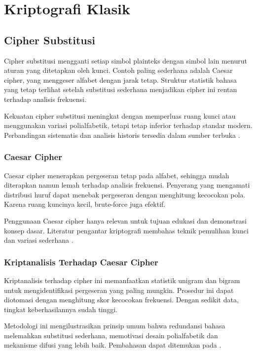 \documentclass[../main.tex]{subfiles}
\begin{document}
\chapter{Kriptografi Klasik}

\section{Cipher Substitusi}
Cipher substitusi mengganti setiap simbol plainteks dengan simbol lain menurut aturan yang ditetapkan oleh kunci. Contoh paling sederhana adalah Caesar cipher, yang menggeser alfabet dengan jarak tetap. Struktur statistik bahasa yang tetap terlihat setelah substitusi sederhana menjadikan cipher ini rentan terhadap analisis frekuensi.

Kekuatan cipher substitusi meningkat dengan memperluas ruang kunci atau menggunakan variasi polialfabetik, tetapi tetap inferior terhadap standar modern. Perbandingan sistematis dan analisis historis tersedia dalam sumber terbuka \parencite{menezes1996handbook}.

\subsection{Caesar Cipher}
Caesar cipher menerapkan pergeseran tetap pada alfabet, sehingga mudah diterapkan namun lemah terhadap analisis frekuensi. Penyerang yang mengamati distribusi huruf dapat menebak pergeseran dengan menghitung kecocokan pola. Karena ruang kuncinya kecil, brute-force juga efektif.

Penggunaan Caesar cipher hanya relevan untuk tujuan edukasi dan demonstrasi konsep dasar. Literatur pengantar kriptografi membahas teknik pemulihan kunci dan variasi sederhana \parencite{menezes1996handbook}.

\subsection{Kriptanalisis Terhadap Caesar Cipher}
Kriptanalisis terhadap cipher ini memanfaatkan statistik unigram dan bigram untuk mengidentifikasi pergeseran yang paling mungkin. Prosedur ini dapat diotomasi dengan menghitung skor kecocokan frekuensi. Dengan sedikit data, tingkat keberhasilannya sudah tinggi.

Metodologi ini mengilustrasikan prinsip umum bahwa redundansi bahasa melemahkan substitusi sederhana, memotivasi desain polialfabetik dan mekanisme difusi yang lebih baik. Pembahasan dapat ditemukan pada \textcite{menezes1996handbook}.
\end{document}
